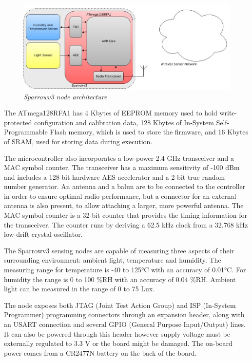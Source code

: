 \begin{figure}[ht]
	\begin{center}
		\includegraphics[width=\textwidth]{img/sparrowv3_node.jpg}
	\end{center}
	\caption{\small \itshape{Sparrowv3 node architecture}}
\end{figure}

The \mbox{ATmega128RFA1} has 4 Kbytes of EEPROM memory used to hold
write-protected configuration and calibration data, 128 Kbytes of In-System
Self-Programmable Flash memory, which is used to store the firmware, and 16
Kbytes of SRAM, used for storing data during execution.

The microcontroller also incorporates a low-power 2.4 GHz transceiver and a MAC
symbol counter. The transceiver has a maximum sensitivity of -100 dBm and
includes a 128-bit hardware AES accelerator and a 2-bit true random number
generator. An antenna and a balun are to be connected to the controller in order
to ensure optimal radio performance, but a connector for an external antenna is
also present, to allow attaching a larger, more powerful antenna. The MAC
symbol counter is a 32-bit counter that provides the timing information for the
transceiver. The counter runs by deriving a 62.5 kHz clock from a 32.768 kHz
low-drift crystal oscillator. 

The Sparrowv3 sensing nodes are capable of measuring three aspects of their
surrounding environment: ambient light, temperature and humidity. The measuring
range for temperature is -40 to 125°C with an accuracy of 0.01°C. For humidity
the range is 0 to 100 \%RH with an accuracy of 0.04 \%RH. Ambient light can be
measured in the range of 0 to 75 Lux.

The node exposes both JTAG (Joint Test Action Group) and ISP (In-System
Programmer) programming connectors through an expansion header, along with an
USART connection and several GPIO (General Purpose Input/Output) lines. It can
also be powered through this header however supply voltage must be externally
regulated to 3.3 V or the board might be damaged.  The on-board power comes
from a CR2477N battery on the back of the board.

